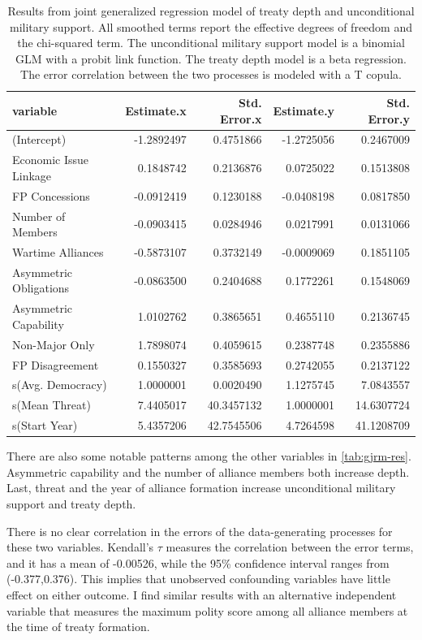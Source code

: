\documentclass[12pt]{article}
\begin{document}
\begin{table}[ht]
\centering
\begin{tabular}{lrrrr}
  \hline
variable & Estimate.x & Std. Error.x & Estimate.y & Std. Error.y \\ 
  \hline
(Intercept) & -1.2892497 & 0.4751866 & -1.2725056 & 0.2467009 \\ 
  Economic Issue Linkage & 0.1848742 & 0.2136876 & 0.0725022 & 0.1513808 \\ 
  FP Concessions & -0.0912419 & 0.1230188 & -0.0408198 & 0.0817850 \\ 
  Number of Members & -0.0903415 & 0.0284946 & 0.0217991 & 0.0131066 \\ 
  Wartime Alliances & -0.5873107 & 0.3732149 & -0.0009069 & 0.1851105 \\ 
  Asymmetric Obligations & -0.0863500 & 0.2404688 & 0.1772261 & 0.1548069 \\ 
  Asymmetric Capability & 1.0102762 & 0.3865651 & 0.4655110 & 0.2136745 \\ 
  Non-Major Only & 1.7898074 & 0.4059615 & 0.2387748 & 0.2355886 \\ 
  FP Disagreement & 0.1550327 & 0.3585693 & 0.2742055 & 0.2137122 \\ 
  s(Avg. Democracy) & 1.0000001 & 0.0020490 & 1.1275745 & 7.0843557 \\ 
  s(Mean Threat) & 7.4405017 & 40.3457132 & 1.0000001 & 14.6307724 \\ 
  s(Start Year) & 5.4357206 & 42.7545506 & 4.7264598 & 41.1208709 \\ 
   \hline
\end{tabular}
\caption{Results from joint generalized regression model of treaty depth and unconditional military support. 
       All smoothed terms report the effective degrees of freedom and the chi-squared term. 
       The unconditional military support model is a binomial GLM with a probit link function. 
       The treaty depth model is a beta regression. 
       The error correlation between the two processes is modeled with a T copula.} 
\label{tab:gjrm-res}
\end{table}


There are also some notable patterns among the other variables in \autoref{tab:gjrm-res}. 
Asymmetric capability and the number of alliance members both increase depth. 
Last, threat and the year of alliance formation increase unconditional military support and treaty depth. 


There is no clear correlation in the errors of the data-generating processes for these two variables. 
Kendall's $\tau$ measures the correlation between the error terms, and it has a mean of -0.00526, while the 95\% confidence interval ranges from (-0.377,0.376).
This implies that unobserved confounding variables have little effect on either outcome. 
I find similar results with an alternative independent variable that measures the maximum polity score among all alliance members at the time of treaty formation. 
\end{document}
